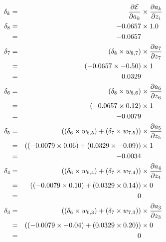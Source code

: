 \documentclass[xcolor={table}]{beamer}
\begin{document}
 \begin{frame} [plain]
 \tiny
\begin{alignat}{3}
\delta_k & = & \frac{\partial \mathcal{E}}{\partial a_k} &\times \frac{\partial a_k}{\partial z_i} \notag\\
\delta_8 & = & -0.0657 &\times 1.0 \notag\\
& = & -0.0657\notag\\
\delta_7 & = & \left(\delta_8 \times w_{8,7}\right) &\times \frac{\partial a_7}{\partial z_7} \notag\\
& = & \left(-0.0657 \times {-0.50}\right) &\times 1 \notag\\
& = & {0.0329}\notag\\
\delta_6 & = & \left(\delta_8 \times w_{8,6}\right) &\times \frac{\partial a_6}{\partial z_6} \notag\\
& = & \left(-0.0657 \times 0.12\right) &\times 1\notag\\
& = & -0.0079\notag\\
\delta_5 & = & \left(\left(\delta_6 \times w_{6,5}\right) + \left(\delta_7 \times w_{7,5}\right) \right) &\times \frac{\partial a_5}{\partial z_5} \notag\\
& = & \left(\left(-0.0079 \times 0.06\right) + \left({0.0329} \times -0.09\right) \right) &\times 1\notag\\
& = & -0.0034\notag\\
\delta_4 & = & \left(\left(\delta_6 \times w_{6,4}\right) + \left(\delta_7 \times w_{7,4}\right) \right) &\times \frac{\partial a_4}{\partial z_4} \notag\\
& = & \left(\left(-0.0079 \times 0.10\right) + \left({0.0329} \times 0.14\right) \right) &\times 0\notag\\
& = & {0}\notag\\
\delta_3 & = & \left(\left(\delta_6 \times w_{6,3}\right) + \left(\delta_7 \times w_{7,3}\right) \right) &\times \frac{\partial a_3}{\partial z_3} \notag\\
& = & \left(\left(-0.0079 \times -0.04\right) + \left({0.0329} \times 0.20\right) \right) &\times 0\notag\\
& = & {0}\notag\\
\label{eq:reludeltacalc}
\end{alignat}
\end{frame} 
\end{document}
